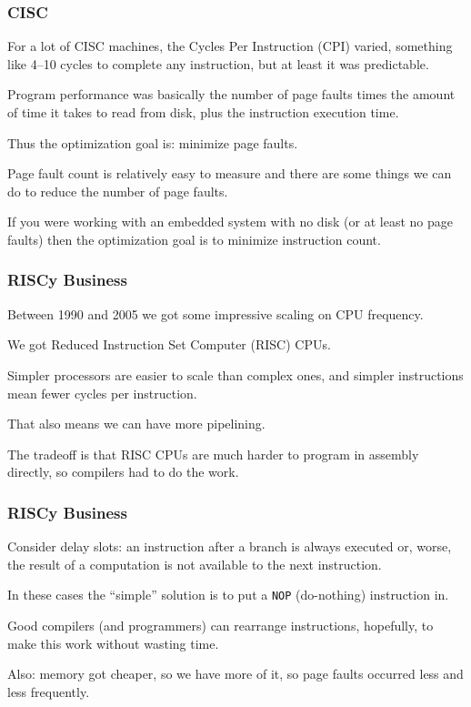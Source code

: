 \begin{frame}
\frametitle{CISC}

For a lot of CISC machines, the Cycles Per Instruction (CPI) varied, something like 4--10 cycles to complete any instruction, but at least it was predictable. 

Program performance was basically the number of page faults times the amount of time it takes to read from disk, plus the instruction execution time.

Thus the optimization goal is: minimize page faults. 

Page fault count is relatively easy to measure and there are some things we can do to reduce the number of page faults.

If you were working with an embedded system with no disk (or at least no page faults) then the optimization goal is to minimize instruction count.

\end{frame}



\begin{frame}
\frametitle{RISCy Business}

Between 1990 and 2005 we got some impressive scaling on CPU frequency.

We got Reduced Instruction Set Computer (RISC) CPUs. 

Simpler processors are easier to scale than complex ones, and simpler instructions mean fewer cycles per instruction.

That also means we can have more pipelining.

 The tradeoff is that RISC CPUs are much harder to program in assembly directly, so compilers had to do the work. 
 
\end{frame}



\begin{frame}
\frametitle{RISCy Business}

Consider delay slots: an instruction after a branch is always executed or, worse, the result of a computation is not available to the next instruction. 

In these cases the ``simple'' solution is to put a \texttt{NOP} (do-nothing) instruction in.

Good compilers (and programmers) can rearrange instructions, hopefully, to make this work without wasting time. 

Also: memory got cheaper, so we have more of it, so page faults occurred less and less frequently.


\end{frame}


